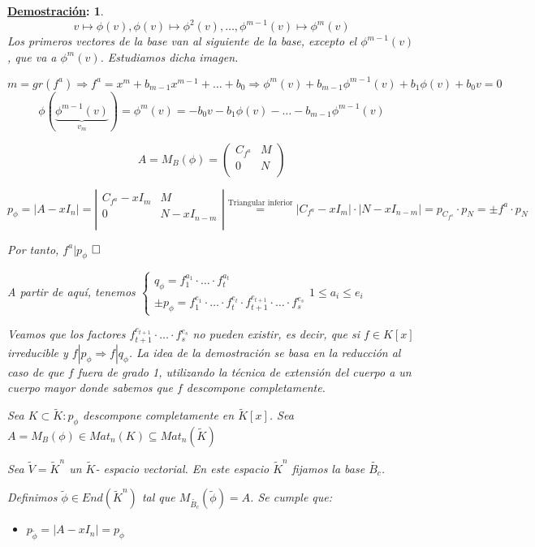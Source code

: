 \documentclass[10pt,a4paper,openright]{book}
\theoremstyle{break}
\newtheorem*{demo}{\underline{Demostración}:}
\begin{document}
\begin{demo}
$$v \mapsto \phi(v) , \phi(v) \mapsto \phi^2(v), \ldots, \phi^{m-1}(v) \mapsto \phi^m(v) $$
Los primeros vectores de la base van al siguiente de la base, excepto el $\phi^{m-1}(v)$, que va a $\phi^m(v)$. Estudiamos dicha imagen.

$$m= gr(f^a) \Rightarrow f^a = x^m + b_{m-1}x^{m-1} + \ldots + b_0  \Rightarrow \phi^m(v) + b_{m-1} \phi^{m-1} (v) + b_1 \phi(v) + b_0 v = 0$$
$$\phi(\underbrace{\phi^{m-1}(v)}_{v_m}) = \phi^m (v) = -b_0 v - b_1 \phi(v) - \ldots - b_{m-1} \phi^{m-1} (v) $$

$$A = M_B (\phi) = \left(\begin{array}{c|c}
C_{f^a} & M \\
\hline
0 & N   \\
\end{array}
\right)$$

$p_\phi = |A - xI_n| = \left|\begin{array}{c|c}
C_{f^a} - xI_m & M \\
\hline
0 & N - xI_{n-m}  \\
\end{array}
\right| \overset{\mbox{Triangular inferior}}{=} |C_{f^a} - xI_m| \cdot |N - xI_{n-m}| = p_{C_{f^a}} \cdot p_N = \pm f^a \cdot p_N$

Por tanto, $f^a | p_\phi$
$\hfill\square$

A partir de aquí, tenemos
$\begin{cases} q_\phi = f^{a_1}_1 \cdot \ldots \cdot f^{a_t}_t \\
\pm p_\phi =  f^{e_1}_1 \cdot \ldots \cdot f^{e_t}_t \cdot f^{e_{t+1}}_{t+1} \cdot \ldots \cdot f^{e_s}_s  \end{cases} 1  \leq a_i \leq e_i$

Veamos que los factores $f^{e_{t+1}}_{t+1} \cdot \ldots \cdot f^{e_s}_s $ no pueden existir, es decir, que si $f \in K[x]$ irreducible y $f | p_\phi \Rightarrow f | q_\phi$. La idea de la demostración se basa en la reducción al caso de que $f$ fuera de grado 1, utilizando la técnica de extensión del cuerpo a un cuerpo mayor donde sabemos que $f$ descompone completamente.

Sea $K \subset \tilde{K} : p_\phi $ descompone completamente en $\tilde{K}[x]$. Sea $A = M_B (\phi) \in Mat_n(K) \subseteq Mat_n(\tilde{K})$

Sea $\tilde{V} = \tilde{K}^n$ un $\tilde{K}$- espacio vectorial. En este espacio $\tilde{K}^n$ fijamos la base $\tilde{B_c}$.

Definimos $\tilde{\phi} \in End(\tilde{K}^n)$ tal que $M_{\tilde{B_c}}(\tilde{\phi}) = A$. Se cumple que:
\begin{itemize}
\item $p_{\tilde{\phi}} = |A - xI_n| = p_\phi$


\end{itemize}
\end{demo}
\end{document}
